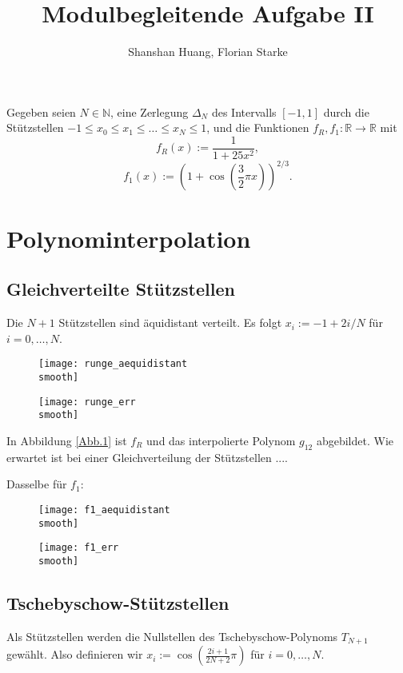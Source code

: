 \documentclass[]{scrartcl}
\title{Modulbegleitende Aufgabe II}
\author{Shanshan Huang, Florian Starke}
\newcommand{\R}{\mathbb{R}}
\newcommand{\N}{\mathbb{N}}
\begin{document}
\def\smooth{_smooth}
	\maketitle
	Gegeben seien $N\in\N$, eine Zerlegung $\Delta_N$ des Intervalls $[-1,1]$ durch die Stützstellen $-1\leq x_0\leq x_1\leq\dots\leq x_N\leq1$, und die Funktionen $f_R,f_1\colon\R\to\R$ mit
	\[f_R(x):=\frac{1}{1+25x^2},\]
	\[f_1(x):=(1+\cos(\frac{3}{2}\pi x))^{2/3}.\]
	\section{Polynominterpolation}
	\subsection{Gleichverteilte Stützstellen}
	Die $N+1$ Stützstellen sind äquidistant verteilt. Es folgt $x_i:=-1+2i/N$ für $i=0,\dots,N$.
	\begin{figure}[h]
		\centering
		\begin{minipage}{0.5\textwidth}
			\texttt{[image: runge\_aequidistant\\smooth]}
			\caption{\label{Abb.1}}
		\end{minipage}
		\begin{minipage}{0.49\textwidth}
			\texttt{[image: runge\_err\\smooth]}
			\caption{\label{Abb.2}}
		\end{minipage}
	\end{figure}
	
	In Abbildung \ref{Abb.1} ist $f_R$ und das interpolierte Polynom $g_{12}$ abgebildet. Wie erwartet ist bei einer Gleichverteilung der Stützstellen ....
	
	Dasselbe für $f_1$:
	\begin{figure}[h]
		\centering
		\begin{minipage}{0.5\textwidth}
			\texttt{[image: f1\_aequidistant\\smooth]}
			\caption{}
		\end{minipage}
		\begin{minipage}{0.49\textwidth}
			\texttt{[image: f1\_err\\smooth]}
			\caption{}
		\end{minipage}
	\end{figure}
	\subsection{Tschebyschow-Stützstellen}
	Als Stützstellen werden die Nullstellen des Tschebyschow-Polynoms $T_{N+1}$ gewählt. Also definieren wir $x_i:=\cos(\frac{2i+1}{2N+2}\pi)$ für $i=0,\dots,N$.
	
\end{document}
